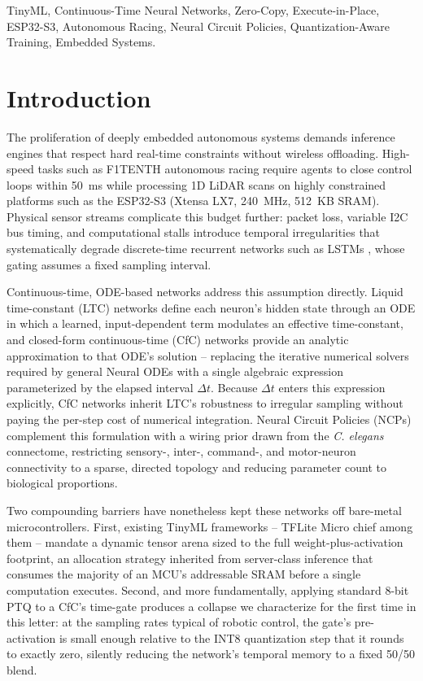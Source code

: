 \documentclass[10pt,journal]{IEEEtran}
\begin{document}
\begin{IEEEkeywords}
TinyML, Continuous-Time Neural Networks, Zero-Copy, Execute-in-Place, ESP32-S3, Autonomous Racing, Neural Circuit Policies, Quantization-Aware Training, Embedded Systems.
\end{IEEEkeywords}

\section{Introduction}

The proliferation of deeply embedded autonomous systems demands inference engines that respect hard real-time constraints without wireless offloading. High-speed tasks such as F1TENTH autonomous racing \cite{okelly2020} require agents to close control loops within 50~ms while processing 1D LiDAR scans on highly constrained platforms such as the ESP32-S3 (Xtensa LX7, 240~MHz, 512~KB SRAM). Physical sensor streams complicate this budget further: packet loss, variable I2C bus timing, and computational stalls introduce temporal irregularities that systematically degrade discrete-time recurrent networks such as LSTMs \cite{hochreiter1997}, whose gating assumes a fixed sampling interval.

Continuous-time, ODE-based networks address this assumption directly. Liquid time-constant (LTC) networks \cite{hasani2021ltc} define each neuron's hidden state through an ODE in which a learned, input-dependent term modulates an effective time-constant, and closed-form continuous-time (CfC) networks \cite{hasani2022cfc} provide an analytic approximation to that ODE's solution -- replacing the iterative numerical solvers required by general Neural ODEs \cite{chen2018node} with a single algebraic expression parameterized by the elapsed interval $\Delta t$. Because $\Delta t$ enters this expression explicitly, CfC networks inherit LTC's robustness to irregular sampling without paying the per-step cost of numerical integration. Neural Circuit Policies (NCPs) \cite{lechner2020} complement this formulation with a wiring prior drawn from the \textit{C. elegans} connectome, restricting sensory-, inter-, command-, and motor-neuron connectivity to a sparse, directed topology and reducing parameter count to biological proportions.

Two compounding barriers have nonetheless kept these networks off bare-metal microcontrollers. First, existing TinyML frameworks -- TFLite Micro \cite{david2021tflm} chief among them -- mandate a dynamic tensor arena sized to the full weight-plus-activation footprint, an allocation strategy inherited from server-class inference that consumes the majority of an MCU's addressable SRAM before a single computation executes. Second, and more fundamentally, applying standard 8-bit PTQ to a CfC's time-gate produces a collapse we characterize for the first time in this letter: at the sampling rates typical of robotic control, the gate's pre-activation is small enough relative to the INT8 quantization step that it rounds to exactly zero, silently reducing the network's temporal memory to a fixed 50/50 blend.
\end{document}
